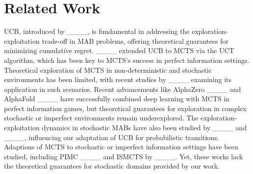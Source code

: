 \section{Related Work}
UCB, introduced by ____, is fundamental in addressing the exploration-exploitation trade-off in MAB problems, offering theoretical guarantees for minimizing cumulative regret. ____ extended UCB to MCTS via the UCT algorithm, which has been key to MCTS's success in perfect information settings. Theoretical exploration of MCTS in non-deterministic and stochastic environments has been limited, with recent studies by ____ examining its application in such scenarios.
\newpage
Recent advancements like AlphaZero ____ and AlphaFold ____ have successfully combined deep learning with MCTS in perfect information games, but theoretical guarantees for exploration in complex stochastic or imperfect environments remain underexplored. 
The exploration-exploitation dynamics in stochastic MABs have also been studied by ____ and ____, influencing our adaptation of UCB for probabilistic transitions. Adaptions of MCTS to stochastic or imperfect information settings have been studied, including PIMC ____ and ISMCTS by ____. Yet, these works lack the theoretical guarantees for stochastic domains provided by our work.

%